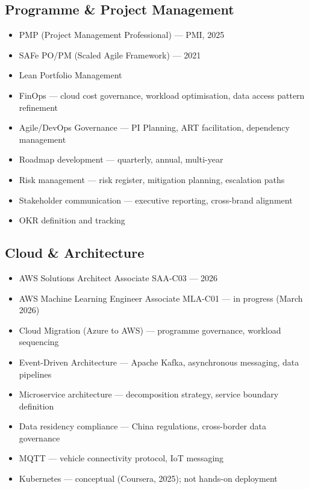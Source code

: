 \documentclass[10pt,a4paper]{article}
\begin{document}
\subsection*{Programme \& Project Management}
\begin{itemize}
  \item PMP (Project Management Professional) — PMI, 2025
  \item SAFe PO/PM (Scaled Agile Framework) — 2021
  \item Lean Portfolio Management
  \item FinOps — cloud cost governance, workload optimisation, data access pattern refinement
  \item Agile/DevOps Governance — PI Planning, ART facilitation, dependency management
  \item Roadmap development — quarterly, annual, multi-year
  \item Risk management — risk register, mitigation planning, escalation paths
  \item Stakeholder communication — executive reporting, cross-brand alignment
  \item OKR definition and tracking
\end{itemize}

\subsection*{Cloud \& Architecture}
\begin{itemize}
  \item AWS Solutions Architect Associate SAA-C03 — 2026
  \item AWS Machine Learning Engineer Associate MLA-C01 — in progress (March 2026)
  \item Cloud Migration (Azure to AWS) — programme governance, workload sequencing
  \item Event-Driven Architecture — Apache Kafka, asynchronous messaging, data pipelines
  \item Microservice architecture — decomposition strategy, service boundary definition
  \item Data residency compliance — China regulations, cross-border data governance
  \item MQTT — vehicle connectivity protocol, IoT messaging
  \item Kubernetes — conceptual (Coursera, 2025); not hands-on deployment
\end{itemize}
\end{document}

